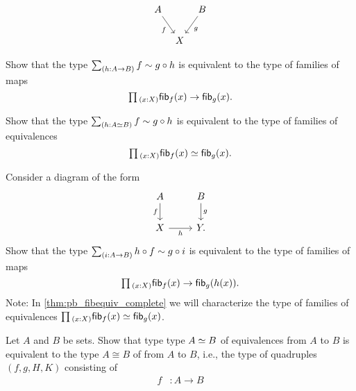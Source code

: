 \begin{exercises}
\begin{equation*}
\begin{tikzcd}[column sep=tiny]
A \arrow[dr,swap,"f"] & & B \arrow[dl,"g"] \\
& X
\end{tikzcd}
\end{equation*}
\begin{subexenum}
\item Show that the type $\sm{h:A\to B} f\htpy g\circ h$ is equivalent to the type of families of maps
\begin{equation*}
\prd{x:X}\fib{f}{x}\to\fib{g}{x}.
\end{equation*}
\item Show that the type $\sm{h:\eqv{A}{B}} f\htpy g\circ h$ is equivalent to the type of families of equivalences
\begin{equation*}
\prd{x:X}\fib{f}{x}\eqvsym\fib{g}{x}.
\end{equation*}
\end{subexenum}
\item \label{ex:sq_fib}Consider a diagram of the form
\begin{equation*}
\begin{tikzcd}
A \arrow[d,swap,"f"] & B \arrow[d,"g"] \\
X \arrow[r,swap,"h"] & Y.
\end{tikzcd}
\end{equation*}
Show that the type $\sm{i:A\to B}h\circ f\htpy g\circ i$ is equivalent to the type of families of maps
\begin{equation*}
\prd{x:X}\fib{f}{x}\to\fib{g}{h(x)}.
\end{equation*}
Note: In \cref{thm:pb_fibequiv_complete} we will characterize the type of families of equivalences $\prd{x:X}\fib{f}{x}\simeq\fib{g}{x}$.
\item \label{ex:iso_equiv}Let $A$ and $B$ be sets. Show that type type $\eqv{A}{B}$ of equivalences from $A$ to $B$ is equivalent to the type $A\cong B$ of  from $A$ to $B$, i.e., the type of quadruples $(f,g,H,K)$ consisting of
\begin{align*}
f & : A\to B \\

\end{align*}
\end{exercises}
